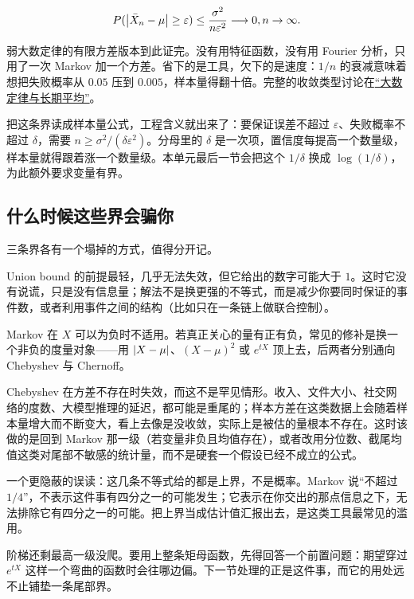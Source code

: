 \[
P(\left|\bar X_n-\mu\right|\ge\varepsilon)\le\frac{\sigma^2}{n\varepsilon^2}\longrightarrow0,\space n\to\infty.
\]

弱大数定律的有限方差版本到此证完。没有用特征函数，没有用 Fourier 分析，只用了一次 Markov 加一个方差。省下的是工具，欠下的是速度：\(1/n\) 的衰减意味着想把失败概率从 \(0.05\) 压到 \(0.005\)，样本量得翻十倍。完整的收敛类型讨论在\hyperref[sec:05-Probability/08-Limit-Theorems/02]{``大数定律与长期平均''}。

把这条界读成样本量公式，工程含义就出来了：要保证误差不超过 \(\varepsilon\)、失败概率不超过 \(\delta\)，需要 \(n\ge\sigma^2/(\delta\varepsilon^2)\)。分母里的 \(\delta\) 是一次项，置信度每提高一个数量级，样本量就得跟着涨一个数量级。本单元最后一节会把这个 \(1/\delta\) 换成 \(\log(1/\delta)\)，为此额外要求变量有界。

\subsection{什么时候这些界会骗你}

三条界各有一个塌掉的方式，值得分开记。

Union bound 的前提最轻，几乎无法失效，但它给出的数字可能大于 \(1\)。这时它没有说谎，只是没有信息量；解法不是换更强的不等式，而是减少你要同时保证的事件数，或者利用事件之间的结构（比如只在一条链上做联合控制）。

Markov 在 \(X\) 可以为负时不适用。若真正关心的量有正有负，常见的修补是换一个非负的度量对象——用 \(\left|X-\mu\right|\)、\((X-\mu)^2\) 或 \(e^{tX}\) 顶上去，后两者分别通向 Chebyshev 与 Chernoff。

Chebyshev 在方差不存在时失效，而这不是罕见情形。收入、文件大小、社交网络的度数、大模型推理的延迟，都可能是重尾的；样本方差在这类数据上会随着样本量增大而不断变大，看上去像是没收敛，实际上是被估的量根本不存在。这时该做的是回到 Markov 那一级（若变量非负且均值存在），或者改用分位数、截尾均值这类对尾部不敏感的统计量，而不是硬套一个假设已经不成立的公式。

一个更隐蔽的误读：这几条不等式给的都是上界，不是概率。Markov 说``不超过 \(1/4\)''，不表示这件事有四分之一的可能发生；它表示在你交出的那点信息之下，无法排除它有四分之一的可能。把上界当成估计值汇报出去，是这类工具最常见的滥用。

阶梯还剩最高一级没爬。要用上整条矩母函数，先得回答一个前置问题：期望穿过 \(e^{tX}\) 这样一个弯曲的函数时会往哪边偏。下一节处理的正是这件事，而它的用处远不止铺垫一条尾部界。
